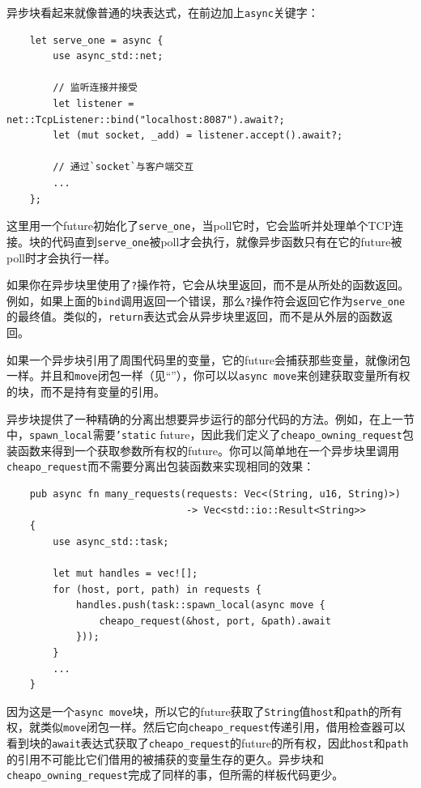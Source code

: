 异步块看起来就像普通的块表达式，在前边加上\texttt{async}关键字：
\begin{verbatim}
    let serve_one = async {
        use async_std::net;

        // 监听连接并接受
        let listener = net::TcpListener::bind("localhost:8087").await?;
        let (mut socket, _add) = listener.accept().await?;

        // 通过`socket`与客户端交互
        ...
    };
\end{verbatim}

这里用一个future初始化了\texttt{serve\_one}，当poll它时，它会监听并处理单个TCP连接。块的代码直到\texttt{serve\_one}被poll才会执行，就像异步函数只有在它的future被poll时才会执行一样。

如果你在异步块里使用了\texttt{?}操作符，它会从块里返回，而不是从所处的函数返回。例如，如果上面的\texttt{bind}调用返回一个错误，那么\texttt{?}操作符会返回它作为\texttt{serve\_one}的最终值。类似的，\texttt{return}表达式会从异步块里返回，而不是从外层的函数返回。

如果一个异步块引用了周围代码里的变量，它的future会捕获那些变量，就像闭包一样。并且和\texttt{move}闭包一样（见“”），你可以以\texttt{async move}来创建获取变量所有权的块，而不是持有变量的引用。

异步块提供了一种精确的分离出想要异步运行的部分代码的方法。例如，在上一节中，\texttt{spawn\_local}需要\texttt{'static} future，因此我们定义了\texttt{cheapo\_owning\_request}包装函数来得到一个获取参数所有权的future。你可以简单地在一个异步块里调用\texttt{cheapo\_request}而不需要分离出包装函数来实现相同的效果：
\begin{verbatim}
    pub async fn many_requests(requests: Vec<(String, u16, String)>)
                               -> Vec<std::io::Result<String>>
    {
        use async_std::task;

        let mut handles = vec![];
        for (host, port, path) in requests {
            handles.push(task::spawn_local(async move {
                cheapo_request(&host, port, &path).await
            }));
        }
        ...
    }
\end{verbatim}

因为这是一个\texttt{async move}块，所以它的future获取了\texttt{String}值\texttt{host}和\texttt{path}的所有权，就类似\texttt{move}闭包一样。然后它向\texttt{cheapo\_request}传递引用，借用检查器可以看到块的\texttt{await}表达式获取了\texttt{cheapo\_request}的future的所有权，因此\texttt{host}和\texttt{path}的引用不可能比它们借用的被捕获的变量生存的更久。异步块和\texttt{cheapo\_owning\_request}完成了同样的事，但所需的样板代码更少。

